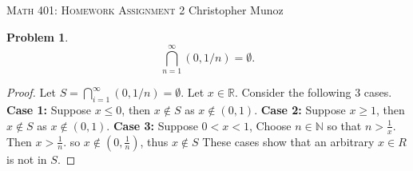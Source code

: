 \documentclass[12pt]{article}
\newtheorem{problem}{Problem}
\newcommand{\RR}{\ensuremath{\mathbb R}}
\newcommand{\NN}{\ensuremath{\mathbb N}}
\begin{document}
\small
\noindent \textsc{Math 401: Homework Assignment 2} \hfill Christopher Munoz

\normalsize
\bigskip

\setcounter{problem}{5}



\begin{problem} %
    $$\bigcap_{n=1}^\infty (0,1/n)=\emptyset.$$
\end{problem}


\begin{proof}
	Let $S = \bigcap\limits_{i=1}^{\infty} (0,1/n) = \emptyset$. Let $x \in \RR$. Consider the following 3 cases. \newline
	\textbf{Case 1: } Suppose $x \leq 0$, then $x \notin S$ as $x \notin (0,1)$. \newline
	\textbf{Case 2: } Suppose $x \geq 1$, then $x \notin S$ as $x \notin (0,1)$. \newline
	\textbf{Case 3: } Suppose $0 < x < 1$, Choose $n \in \NN$ so that $n > \frac{1}{x}$. Then $x > \frac{1}{n}$. so $x \notin (0, \frac{1}{n})$, thus $x \notin S$
	\newline
	These cases show that an arbitrary $x \in R$ is not in $S$.
\end{proof}
\end{document}
